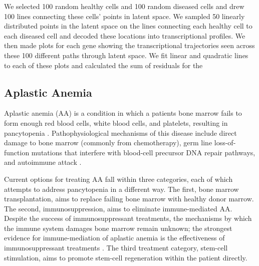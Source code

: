 \documentclass{article}
\begin{document}
We selected 100 random healthy cells and 100 random diseased cells and drew 100 lines connecting these cells’ points in latent space. We sampled 50 linearly distributed points in the latent space on the lines connecting each healthy cell to each diseased cell and decoded these locations into transcriptional profiles. We then made plots for each gene showing the transcriptional trajectories seen across these 100 different paths through latent space. We fit linear and quadratic lines to each of these plots and calculated the sum of residuals for the 

\subsection{Aplastic Anemia}
Aplastic anemia (AA) is a condition in which a patient\textquotesingle s bone marrow fails to form enough red blood cells, white blood cells, and platelets, resulting in pancytopenia \citep{young_aplastic_2018}.
Pathophysiological mechanisms of this disease include direct damage to bone marrow (commonly from chemotherapy), germ line loss-of-function mutations that interfere with blood-cell precursor DNA repair pathways, and autoimmune attack \citep{young_aplastic_2018}. 

Current options for treating AA fall within three categories, each of which attempts to address pancytopenia in a different way.
The first, bone marrow transplantation, aims to replace failing bone marrow with healthy donor marrow. 
The second, immunosuppression, aims to eliminate immune-mediated AA.
Despite the success of immunosuppressant treatments, the mechanisms by which the immune system damages bone marrow remain unknown; the strongest evidence for immune-mediation of aplastic anemia is the effectiveness of immunosuppressant treatments \citep{young_aplastic_2018}.
The third treatment category, stem-cell stimulation, aims to promote stem-cell regeneration within the patient directly.
\end{document}

